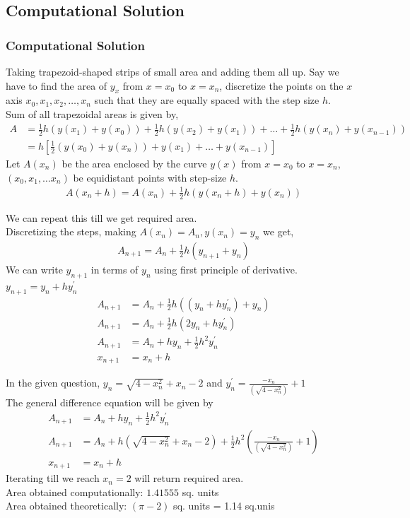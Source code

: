 \documentclass{beamer}
\providecommand{\sbrak}[1]{\ensuremath{{}\left[#1\right]}}
\providecommand{\brak}[1]{\ensuremath{\left(#1\right)}}
\theoremstyle{remark}
\numberwithin{equation}{section}
\begin{document}
\subsection{Computational Solution}
\begin{frame}
\frametitle{Computational Solution}
Taking trapezoid-shaped strips of small area and adding them all up. Say we have to find the area of $y_{x}$ from $x=x_0$ to $x=x_n$, discretize the points on the $x$ axis $x_0, x_1, x_2, \dots, x_n$ such that they are equally spaced with the step size $h$. \\
Sum of all trapezoidal areas is given by,
{\small
\begin{align}
  A&=\frac{1}{2}h\brak{y\brak{x_1}+y\brak{x_0}}+ \frac{1}{2}h\brak{y\brak{x_2}+y\brak{x_1}}+\dots+\frac{1}{2}h\brak{y\brak{x_n}+y\brak{x_{n-1}}}\\
  &=h\sbrak{\frac{1}{2}\brak{y\brak{x_0}+y\brak{x_n}}+ y\brak{x_1}+\dots+y\brak{x_{n-1}}}
\end{align}
}
Let $A\brak{x_n}$ be the area enclosed by the curve $y\brak{x}$ from $x=x_0$ to $x=x_n$, $\brak{x_0, x_1, \dots x_n}$ be equidistant points with step-size $h$.
\begin{align}
  A\brak{x_n+h}=A\brak{x_n}+\frac{1}{2}h\brak{y\brak{x_n+h}+y\brak{x_n}}
\end{align}
\end{frame}
\begin{frame}
We can repeat this till we get required area.\\
Discretizing the steps, making $A\brak{x_n}=A_n, y\brak{x_n}=y_n$ we get,
\begin{align}
 A_{n+1}=A_n+\frac{1}{2}h\brak{y_{n+1}+y_n}
\end{align}
We can write $y_{n+1}$ in terms of $y_n$ using first principle of derivative. $y_{n+1}=y_n+hy^{\prime}_n$
\begin{align}
  A_{n+1}&=A_n+\frac{1}{2}h\brak{\brak{y_{n}+hy^{\prime}_n}+y_n}\\
  A_{n+1}&=A_n+\frac{1}{2}h\brak{2y_n+hy^{\prime}_n}\\
  A_{n+1}&=A_n+hy_n+\frac{1}{2}h^2y^{\prime}_n\\
  x_{n+1}&=x_n+h
\end{align}
\end{frame}
\begin{frame}
    In the given question, $y_n=\sqrt{4-x_n^2} + x_n -2$ and $y^{\prime}_n= \frac{-x_n}{\brak{\sqrt{4-x_n^2}}} +1 $\\
The general difference equation will be given by
\begin{align}
  A_{n+1}&=A_n+hy_n+\frac{1}{2}h^2y^{\prime}_n\\
  A_{n+1}&=A_n+h\brak{\sqrt{4-x_n^2} + x_n -2}+\frac{1}{2}h^2\brak{\frac{-x_n}{\brak{\sqrt{4-x_n^2}}} +1}\\
  x_{n+1}&=x_n+h
\end{align}
Iterating till we reach $x_n=2$ will return required area. \\
Area obtained computationally: $1.41555$ sq. units\\
Area obtained theoretically: $\brak{\pi - 2}$ sq. units = 1.14 sq.unis
\end{frame}
\end{document}
